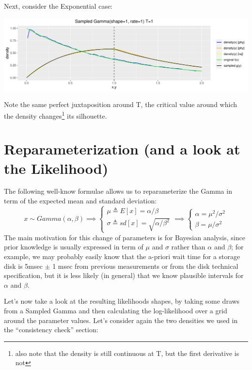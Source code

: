 \documentclass[]{article}
\begin{document}
Next, consider the Exponential case:

\begin{center}\includegraphics[width=1.0\textwidth]{sampling_event_duration_files/figure-latex/cons_check_arount_t-1} \end{center}

Note the same perfect juxtaposition around T, the critical value around
which the density changes\footnote{also note that the density is still
  continuous at T, but the first derivative is not} its silhouette.

\hypertarget{reparameterization-and-a-look-at-the-likelihood}{%
\section{Reparameterization (and a look at the
Likelihood)}\label{reparameterization-and-a-look-at-the-likelihood}}

The following well-know formulae allows us to reparameterize the Gamma
in term of the expected mean and standard deviation: \[
  x \sim Gamma(\alpha, \beta)   
  \implies
  \begin{cases}
    \mu \triangleq E[x] = \alpha / \beta \\
    \sigma \triangleq sd[x] = \sqrt{\alpha / \beta^2 }
  \end{cases}
  \implies
  \begin{cases}
    \alpha = \mu^2 / \sigma^2 \\
    \beta = \mu   / \sigma^2
  \end{cases}
\] The main motivation for this change of parameters is for Bayesian
analysis, since prior knowledge is usually expressed in term of \(\mu\)
and \(\sigma\) rather than \(\alpha\) and \(\beta\); for example, we may
probably easily know that the a-priori wait time for a storage disk is
5msec \(\pm\) 1 msec from previous measurements or from the disk
technical specification, but it is less likely (in general) that we know
plausible intervals for \(\alpha\) and \(\beta\).

Let's now take a look at the resulting likelihoods shapes, by taking
some draws from a Sampled Gamma and then calculating the log-likelihood
over a grid around the parameter values. Let's consider again the two
densities we used in the ``consistency check'' section:
\end{document}
